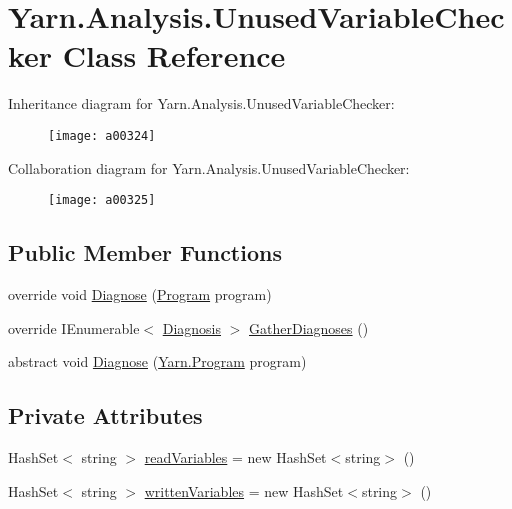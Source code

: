 \hypertarget{a00084}{\section{Yarn.\-Analysis.\-Unused\-Variable\-Checker Class Reference}
\label{a00084}
}


Inheritance diagram for Yarn.\-Analysis.\-Unused\-Variable\-Checker\-:
\nopagebreak
\begin{figure}[H]
\begin{center}
\leavevmode
\texttt{[image: a00324]}
\end{center}
\end{figure}


Collaboration diagram for Yarn.\-Analysis.\-Unused\-Variable\-Checker\-:
\nopagebreak
\begin{figure}[H]
\begin{center}
\leavevmode
\texttt{[image: a00325]}
\end{center}
\end{figure}
\subsection*{Public Member Functions}
\begin{DoxyCompactItemize}
\item 
override void \hyperlink{a00084_aeac8f333d4dcc85f4d4a716bf8fea01f}{Diagnose} (\hyperlink{a00067}{Program} program)
\item 
override I\-Enumerable$<$ \hyperlink{a00035}{Diagnosis} $>$ \hyperlink{a00084_a107aecf707b130c4b733930a95f9154e}{Gather\-Diagnoses} ()
\item 
abstract void \hyperlink{a00028_aba4a36cb823b11ee491074e26477d084}{Diagnose} (\hyperlink{a00067}{Yarn.\-Program} program)
\end{DoxyCompactItemize}
\subsection*{Private Attributes}
\begin{DoxyCompactItemize}
\item 
Hash\-Set$<$ string $>$ \hyperlink{a00084_a6b542092ddce1b92c9455d60899518a9}{read\-Variables} = new Hash\-Set$<$string$>$ ()
\item 
Hash\-Set$<$ string $>$ \hyperlink{a00084_a0c2fe6eded1b10b135ca2469f5980a39}{written\-Variables} = new Hash\-Set$<$string$>$ ()
\end{DoxyCompactItemize}


